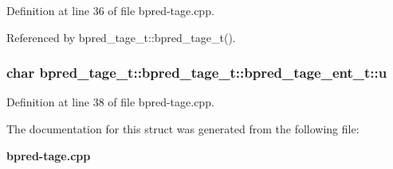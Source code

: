 Definition at line 36 of file bpred-tage.cpp.

Referenced by bpred\_\-tage\_\-t::bpred\_\-tage\_\-t().
\subsubsection[{u}]{\setlength{\rightskip}{0pt plus 5cm}char bpred\_\-tage\_\-t::bpred\_\-tage\_\-t::bpred\_\-tage\_\-ent\_\-t::u}\label{structbpred__tage__t_1_1bpred__tage__ent__t_4425d849b9d0fbda655c56f7938f3bf7}




Definition at line 38 of file bpred-tage.cpp.

The documentation for this struct was generated from the following file:\begin{CompactItemize}
\item 
{\bf bpred-tage.cpp}\end{CompactItemize}
